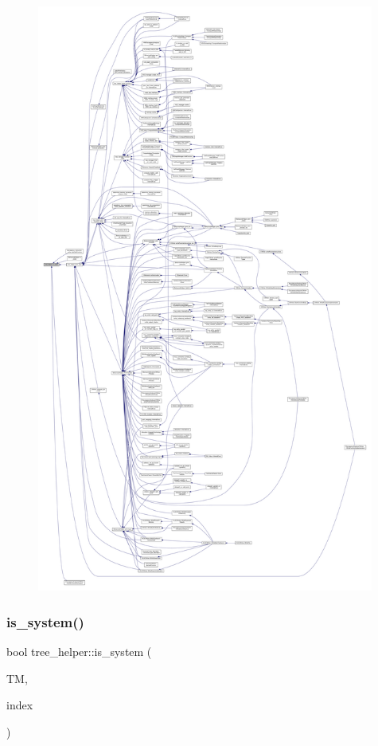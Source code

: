 \begin{figure}[H]
\begin{center}
\leavevmode
\includegraphics[height=550pt]{d7/d99/classtree__helper_a962b5e392c5e3b7c9f461c4460ee6f8b_icgraph}
\end{center}
\end{figure}
\mbox{\label{classtree__helper_a40fcd51b5a839f80fc2120307e240d39}} 
\subsubsection{\texorpdfstring{is\+\_\+system()}{is\_system()}}
{\footnotesize\ttfamily bool tree\+\_\+helper\+::is\+\_\+system (\begin{DoxyParamCaption}\item[{const \hyperlink{tree__manager_8hpp_a792e3f1f892d7d997a8d8a4a12e39346}{tree\+\_\+manager\+Const\+Ref}}]{TM,  }\item[{const unsigned int}]{index }\end{DoxyParamCaption})\hspace{0.3cm}{\ttfamily [static]}}




